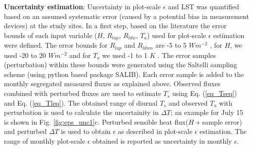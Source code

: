 \documentclass[fleqn,10pt]{wlscirep}
\begin{document}
{{\textbf{Uncertainty estimation}:
Uncertainty in plot-scale $\epsilon$ and LST was quantified based on an assumed systematic error (caused by a potential bias in measurement devices) at the study sites. 
In a first step, based on the literature \cite{trenberth2012tracking,foken2008energy} the error bounds of each input variable ($ H$, $R_{lup}$, $R_{ldw}$, $T_{a}$) used for plot-scale $\epsilon$ estimation were defined. The error bounds for $R_{lup}$ and $R_{ldwn}$ are -5 to 5 $Wm^{-2}$ \cite{trenberth2012tracking}, for $H$, we used -20 to 20 $Wm^{-2}$ and for $T_{a}$ we used -1 to 1 $K$ \cite{foken2008energy}. The error samples (perturbation) within these bounds were generated using the Saltelli sampling scheme (using python based package SALIB\cite{saltelli2017new}). Each error sample is added to the monthly segregated measured fluxes as explained above. Observed fluxes combined with perturbed fluxes are used to estimate $T_{s}$ using Eq. (\ref{eq_Tseq}) and  Eq. (\ref{eq_Tleq}). The obtained range of diurnal $T_{s}$ and observed $T_{a}$ with perturbation is used to calculate the uncertainity in $\Delta T$; an example for July 15 is shown in Fig. \ref{fig:eps_unc1}c. Perturbed sensible heat flux($H + $sample error) and perturbed $\Delta T$ is used to obtain $\epsilon$ as described in plot-scale $\epsilon$ estimation. The range of monthly plot-scale $\epsilon$ obtained is reported as uncertainty in monthly $\epsilon$. 

}}
\end{document}
